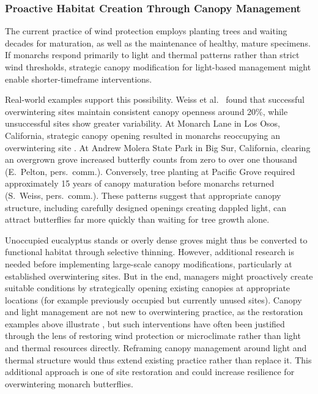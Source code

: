\documentclass[insects,article,submit,pdftex,moreauthors]{Definitions/mdpi}
\begin{document}
\subsubsection{Proactive Habitat Creation Through Canopy Management}

The current practice of wind protection employs planting trees and waiting decades for maturation, as well as the maintenance of healthy, mature specimens. If monarchs respond primarily to light and thermal patterns rather than strict wind thresholds, strategic canopy modification for light-based management might enable shorter-timeframe interventions.

Real-world examples support this possibility. Weiss et al.\ \cite{weissForestCanopyStructure1991} found that successful overwintering sites maintain consistent canopy openness around 20\%, while unsuccessful sites show greater variability. At Monarch Lane in Los Osos, California, strategic canopy opening resulted in monarchs reoccupying an overwintering site \cite{leongRestorationOverwinteringGrove1999,xercessocietyWesternMonarchButterfly2025}. At Andrew Molera State Park in Big Sur, California, clearing an overgrown grove increased butterfly counts from zero to over one thousand (E.\ Pelton, pers.\ comm.). Conversely, tree planting at Pacific Grove required approximately 15 years of canopy maturation before monarchs returned (S.\ Weiss, pers.\ comm.). These patterns suggest that appropriate canopy structure, including carefully designed openings creating dappled light, can attract butterflies far more quickly than waiting for tree growth alone.

Unoccupied eucalyptus stands or overly dense groves might thus be converted to functional habitat through selective thinning. However, additional research is needed before implementing large-scale canopy modifications, particularly at established overwintering sites. But in the end, managers might proactively create suitable conditions by strategically opening existing canopies at appropriate locations (for example previously occupied but currently unused sites). Canopy and light management are not new to overwintering practice, as the restoration examples above illustrate \cite{leongRestorationOverwinteringGrove1999,weissForestCanopyStructure1991}, but such interventions have often been justified through the lens of restoring wind protection or microclimate rather than light and thermal resources directly. Reframing canopy management around light and thermal structure would thus extend existing practice rather than replace it. This additional approach is one of site restoration and could increase resilience for overwintering monarch butterflies.
\end{document}
